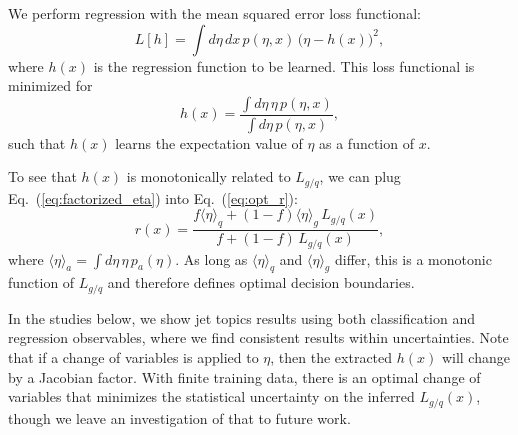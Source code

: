 \documentclass[aps,prd,twocolumn,preprintnumbers,nofootinbib,longbibliography,floatfix]{revtex4-1}
\DeclareRobustCommand{\Eq}[1]{Eq.~(\ref{#1})}
\newcommand{\vev}[1]{\langle #1 \rangle}
\begin{document}
We perform regression with the mean squared error loss functional:
%
\begin{equation} \label{eq:loss}
	L[h] = \int d\eta \, dx \, p(\eta,x) \, \big(\eta - h(x)\big)^2,
\end{equation}
%
where $h(x)$ is the regression function to be learned.
%
This loss functional is minimized for
%
\begin{equation}
\label{eq:opt_r}
	h(x) = \frac{\int d\eta \, \eta  \, p(\eta,x)}
		{\int d\eta \, p(\eta,x)},
\end{equation}
%
such that $h(x)$ learns the expectation value of $\eta$ as a function of $x$.


To see that $h(x)$ is monotonically related to $L_{g/q}$, we can plug \Eq{eq:factorized_eta} into \Eq{eq:opt_r}:
%
\begin{equation}
r(x) = \frac{f \vev{\eta}_q + (1-f) \vev{\eta}_g \, L_{g/q} (x)}{f + (1-f) \, L_{g/q} (x)},
\end{equation}
%
where $\vev{\eta}_a = \int d\eta \,\eta \, p_a(\eta)$.
%
As long as $\vev{\eta}_q$ and $\vev{\eta}_g$ differ, this is a monotonic function of $L_{g/q}$ and therefore defines optimal decision boundaries.


In the studies below, we show jet topics results using both classification and regression observables, where we find consistent results within uncertainties.
%
Note that if a change of variables is applied to $\eta$, then the extracted $h(x)$ will change by a Jacobian factor.
%
With finite training data, there is an optimal change of variables that minimizes the statistical uncertainty on the inferred $L_{g/q}(x)$, though we leave an investigation of that to future work.





\end{document}
